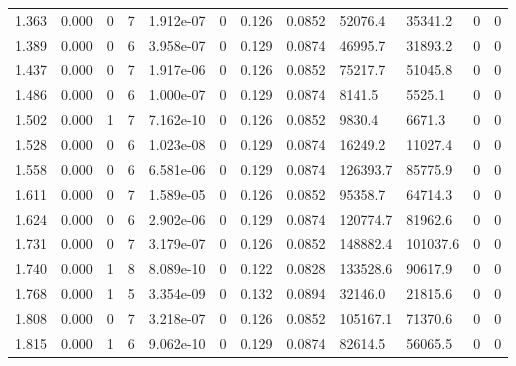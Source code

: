 \documentclass[preview]{standalone}
\begin{document}
{{\begin{tabular}{L{1.2cm}C{1.2cm} C{0.3cm}C{0.5cm} C{1.4cm}C{1.4cm} C{1.4cm}C{1.4cm} C{1.6cm}C{1.6cm} C{1.6cm}C{1.6cm}}
  1.363  &  0.000  & 0     &  7 &  1.912e-07  & 0  &  0.126&   0.0852& 52076.4 & 35341.2   &  0 & 0  \\ 
  1.389  &  0.000  & 0     &  6 &  3.958e-07  & 0  &  0.129&   0.0874& 46995.7 & 31893.2   &  0 & 0  \\ 
  1.437  &  0.000  & 0     &  7 &  1.917e-06  & 0  &  0.126&   0.0852& 75217.7 & 51045.8   &  0 & 0  \\ 
  1.486  &  0.000  & 0     &  6 &  1.000e-07  & 0  &  0.129&   0.0874& 8141.5 & 5525.1   &  0 & 0  \\ 
  1.502  &  0.000  & 1     &  7 &  7.162e-10  & 0  &  0.126&   0.0852& 9830.4 & 6671.3   &  0 & 0  \\ 
  1.528  &  0.000  & 0     &  6 &  1.023e-08  & 0  &  0.129&   0.0874& 16249.2 & 11027.4   &  0 & 0  \\ 
  1.558  &  0.000  & 0     &  6 &  6.581e-06  & 0  &  0.129&   0.0874& 126393.7 & 85775.9   &  0 & 0  \\ 
  1.611  &  0.000  & 0     &  7 &  1.589e-05  & 0  &  0.126&   0.0852& 95358.7 & 64714.3   &  0 & 0  \\ 
  1.624  &  0.000  & 0     &  6 &  2.902e-06  & 0  &  0.129&   0.0874& 120774.7 & 81962.6   &  0 & 0  \\ 
  1.731  &  0.000  & 0     &  7 &  3.179e-07  & 0  &  0.126&   0.0852& 148882.4 & 101037.6   &  0 & 0  \\ 
  1.740  &  0.000  & 1     &  8 &  8.089e-10  & 0  &  0.122&   0.0828& 133528.6 & 90617.9   &  0 & 0  \\ 
  1.768  &  0.000  & 1     &  5 &  3.354e-09  & 0  &  0.132&   0.0894& 32146.0 & 21815.6   &  0 & 0  \\ 
  1.808  &  0.000  & 0     &  7 &  3.218e-07  & 0  &  0.126&   0.0852& 105167.1 & 71370.6   &  0 & 0  \\ 
  1.815  &  0.000  & 1     &  6 &  9.062e-10  & 0  &  0.129&   0.0874& 82614.5 & 56065.5   &  0 & 0  \\ 
\hline 
\end{tabular} 

}}
\end{document}
